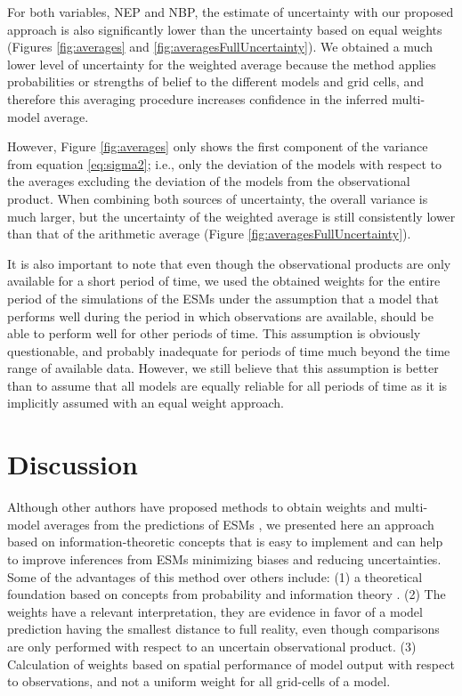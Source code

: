 \documentclass[gmd, manuscript]{copernicus}
\begin{document}
For both variables, NEP and NBP, the estimate of uncertainty with our proposed approach is also significantly lower than the uncertainty based on equal weights (Figures \ref{fig:averages} and \ref{fig:averagesFullUncertainty}). We obtained a much lower level of uncertainty for the weighted average because the method applies probabilities or strengths of belief to the different models and grid cells, and therefore this averaging procedure increases confidence in the inferred multi-model average. 

However, Figure \ref{fig:averages} only shows the first component of the variance from equation \ref{eq:sigma2}; i.e., only the deviation of the models with respect to the averages excluding the deviation of the models from the observational product. When combining both sources of uncertainty, the overall variance is much larger, but the uncertainty of the weighted average is still consistently lower than that of the arithmetic average (Figure \ref{fig:averagesFullUncertainty}). 

It is also important to note that even though the observational products are only available for a short period of time, we used the obtained weights for the entire period of the simulations of the ESMs under the assumption that a model that performs well during the period in which observations are available, should be able to perform well for other periods of time. This assumption is obviously questionable, and probably inadequate for periods of time much beyond the time range of available data. However, we still believe that this assumption is better than to assume that all models are equally reliable for all periods of time as it is implicitly assumed with an equal weight approach. 

\section{Discussion}
Although other authors have proposed methods to obtain weights and multi-model averages from the predictions of ESMs \citep[and references therein]{Tebaldi2007}, we presented here an approach based on information-theoretic concepts that is easy to implement and can help to improve inferences from ESMs minimizing biases and reducing uncertainties. 
Some of the advantages of this method over others include: (1) a theoretical foundation based on concepts from probability and information theory \citep{Akaike1974, Akaike1981, Anderson2007, Burnham2002}. (2) The weights have a relevant interpretation, they are evidence in favor of a model prediction having the smallest distance to full reality, even though comparisons are only performed with respect to an uncertain observational product. 
(3) Calculation of weights based on spatial performance of model output with respect to observations, and not a uniform weight for all grid-cells of a model.
\end{document}
